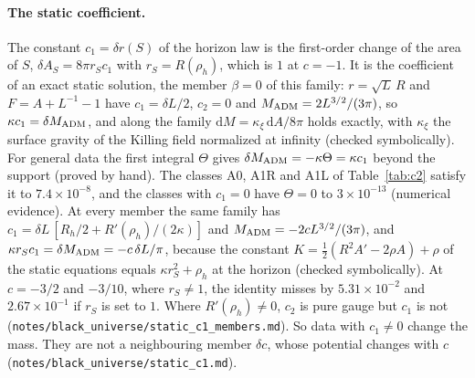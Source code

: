 \documentclass[11pt]{article}
\theoremstyle{plain}
\newcommand{\dd}{\mathrm{d}}
\begin{document}
\paragraph{The static coefficient.} The constant $c_1=\delta r(S)$ of the horizon law is the first-order change of the area of
$S$, $\delta A_S=8\pi r_Sc_1$ with $r_S=R(\rho_h)$, which is $1$ at $c=-1$. It is the coefficient of an exact static solution, the member $\beta=0$ of this family:
$r=\sqrt L\,R$ and $F=A+L^{-1}-1$ have $c_1=\delta L/2$, $c_2=0$ and $M_{\rm ADM}=2L^{3/2}/(3\pi)$, so $\kappa c_1=\delta M_{\rm ADM}$,
and along the family $\dd M=\kappa_\xi\,\dd A/8\pi$ holds exactly, with $\kappa_\xi$ the surface gravity of the Killing field
normalized at infinity (checked symbolically). For general data the first integral $\Theta$ gives $\delta M_{\rm ADM}=-\kappa\Theta=\kappa c_1$
beyond the support (proved by hand). The classes A0, A1R and A1L of Table~\ref{tab:c2} satisfy it to $7.4\times10^{-8}$, and the
classes with $c_1=0$ have $\Theta=0$ to $3\times10^{-13}$ (numerical evidence). At every member the same family has
$c_1=\delta L\,[R_h/2+R'(\rho_h)/(2\kappa)]$ and $M_{\rm ADM}=-2cL^{3/2}/(3\pi)$, and $\kappa r_Sc_1=\delta M_{\rm ADM}=-c\,\delta L/\pi$, because
the constant $K=\tfrac12(R^2A'-2\rho A)+\rho$ of the static equations equals $\kappa r_S^2+\rho_h$ at the horizon (checked
symbolically). At $c=-3/2$ and $-3/10$, where $r_S\ne1$, the identity misses by $5.31\times10^{-2}$ and $2.67\times10^{-1}$ if $r_S$ is set to
$1$. Where $R'(\rho_h)\ne0$, $c_2$ is pure gauge but $c_1$ is not (\texttt{notes/black\_universe/static\_c1\_members.md}). So data with
$c_1\ne0$ change the mass. They are not
a neighbouring member $\delta c$, whose potential changes with $c$ (\texttt{notes/black\_universe/static\_c1.md}).
\nopagebreak
\end{document}
